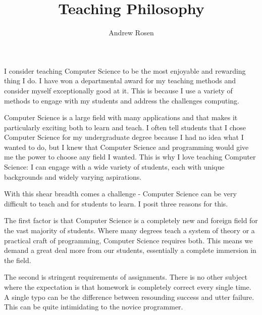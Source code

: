 \documentclass[10pt, a4paper]{article}
\author{Andrew Rosen}
\title{Teaching Philosophy}
\date{}
\begin{document}
\maketitle


I consider teaching Computer Science to be the most enjoyable and rewarding thing I do.
I have won a departmental award for my teaching methods and consider myself exceptionally good at it.
This is because I use a variety of methods to engage with my students and address the challenges computing.



% 


Computer Science is a large field with many applications and that makes it particularly exciting both to learn and teach.
I often tell students that I chose Computer Science for my undergraduate degree because I had no idea what I wanted to do, but I knew that Computer Science and programming would give me the power to choose any field I wanted.
This is why I love teaching Computer Science:  I can engage with a wide variety of students, each with unique backgrounds and widely varying aspirations.

With this shear breadth comes a challenge - Computer Science can be very difficult to teach and for students to learn.
I posit three reasons for this.

The first factor is that Computer Science is a completely new and foreign field for the vast majority of students.
Where many degrees teach a system of theory or a practical craft of programming, Computer Science requires both. 
This means we demand a great deal more from our students, essentially a complete immersion in the field.

The second is stringent requirements of assignments.
There is no other subject where the expectation is that homework is completely correct every single time.
A single typo can be the difference between resounding success and utter failure.
This can be quite intimidating to the novice programmer.
\end{document}
